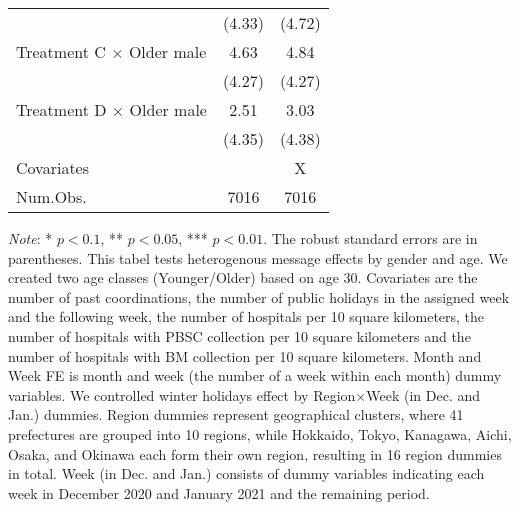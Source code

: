 \documentclass[12pt, a4paper]{article}
\begin{document}
\begin{table}[H]
\begin{threeparttable}
\begin{tabular}[t]{lcc}
 & (\num{4.33}) & (\num{4.72})\\
Treatment C $\times$ Older male & \num{4.63} & \num{4.84}\\
 & (\num{4.27}) & (\num{4.27})\\
Treatment D $\times$ Older male & \num{2.51} & \num{3.03}\\
 & (\num{4.35}) & (\num{4.38})\\
\midrule
Covariates &  & X\\
Num.Obs. & \num{7016} & \num{7016}\\
\bottomrule
\end{tabular}
\begin{tablenotes}
\item \emph{Note}: * $p < 0.1$, ** $p < 0.05$, *** $p < 0.01$. The robust standard errors are in parentheses. This tabel tests heterogenous message effects by gender and age. We created two age classes (Younger/Older) based on age 30. Covariates are the number of past coordinations, the number of public holidays in the assigned week and the following week, the number of hospitals per 10 square kilometers, the number of hospitals with PBSC collection per 10 square kilometers and the number of hospitals with BM collection per 10 square kilometers. Month and Week FE is month and week (the number of a week within each month) dummy variables. We controlled winter holidays effect by Region$\times$Week (in Dec. and Jan.) dummies. Region dummies represent geographical clusters, where 41 prefectures are grouped into 10 regions, while Hokkaido, Tokyo, Kanagawa, Aichi, Osaka, and Okinawa each form their own region, resulting in 16 region dummies in total. Week (in Dec. and Jan.) consists of dummy variables indicating each week in December 2020 and January 2021 and the remaining period.
\end{tablenotes}
\end{threeparttable}
\end{table}
\end{document}
